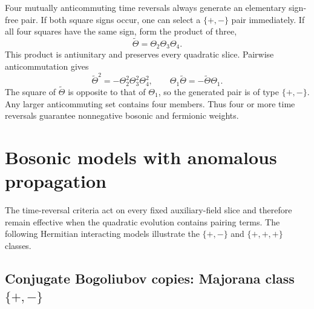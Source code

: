 \documentclass[onecolumn,aps,prb,amsmath,amssymb,superscriptaddress,longbibliography]{revtex4-2}
\begin{document}
Four mutually anticommuting time reversals always generate an elementary sign-free pair.  If both square signs occur, one can select a \(\{+,-\}\) pair immediately.  If all four squares have the same sign, form the product of three,
\begin{equation}
    \widetilde\Theta=\Theta_2\Theta_3\Theta_4.
    \label{eq:generated_TR}
\end{equation}
This product is antiunitary and preserves every quadratic slice.  Pairwise anticommutation gives
\begin{equation}
    \widetilde\Theta^2
    =-\Theta_2^2\Theta_3^2\Theta_4^2,
    \qquad
    \Theta_1\widetilde\Theta
    =-\widetilde\Theta\Theta_1.
    \label{eq:generated_TR_properties}
\end{equation}
The square of \(\widetilde\Theta\) is opposite to that of \(\Theta_1\), so the generated pair is of type \(\{+,-\}\).  Any larger anticommuting set contains four members.  Thus four or more time reversals guarantee nonnegative bosonic and fermionic weights.

\section{Bosonic models with anomalous propagation}

The time-reversal criteria act on every fixed auxiliary-field slice and therefore remain effective when the quadratic evolution contains pairing terms.  The following Hermitian interacting models illustrate the \(\{+,-\}\) and \(\{+,+,+\}\) classes.

\subsection{Conjugate Bogoliubov copies: Majorana class \texorpdfstring{\(\{+,-\}\)}{\{+,-\}}}
\end{document}
